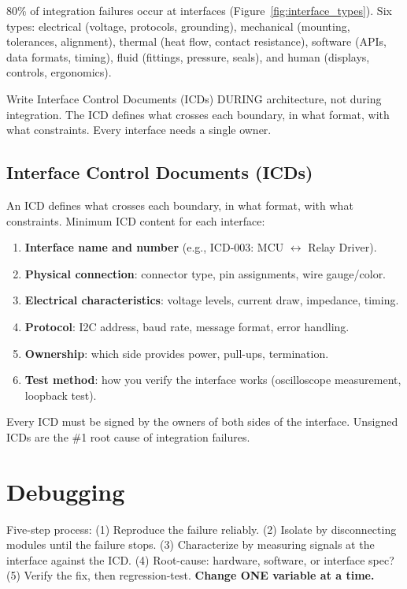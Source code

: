 

80\% of integration failures occur at interfaces (Figure~\ref{fig:interface_types}). Six types: electrical (voltage, protocols, grounding), mechanical (mounting, tolerances, alignment), thermal (heat flow, contact resistance), software (APIs, data formats, timing), fluid (fittings, pressure, seals), and human (displays, controls, ergonomics).

Write Interface Control Documents (ICDs) DURING architecture, not during integration. The ICD defines what crosses each boundary, in what format, with what constraints. Every interface needs a single owner.


\subsection{Interface Control Documents (ICDs)}
An ICD defines what crosses each boundary, in what format, with what constraints. Minimum ICD content for each interface:
\begin{enumerate}[nosep,leftmargin=1.5em]
\item \textbf{Interface name and number} (e.g., ICD-003: MCU $\leftrightarrow$ Relay Driver).
\item \textbf{Physical connection}: connector type, pin assignments, wire gauge/color.
\item \textbf{Electrical characteristics}: voltage levels, current draw, impedance, timing.
\item \textbf{Protocol}: I2C address, baud rate, message format, error handling.
\item \textbf{Ownership}: which side provides power, pull-ups, termination.
\item \textbf{Test method}: how you verify the interface works (oscilloscope measurement, loopback test).
\end{enumerate}

Every ICD must be signed by the owners of both sides of the interface. Unsigned ICDs are the \#1 root cause of integration failures.

\section{Debugging}
Five-step process: (1) Reproduce the failure reliably. (2) Isolate by disconnecting modules until the failure stops. (3) Characterize by measuring signals at the interface against the ICD. (4) Root-cause: hardware, software, or interface spec? (5) Verify the fix, then regression-test. \textbf{Change ONE variable at a time.}

